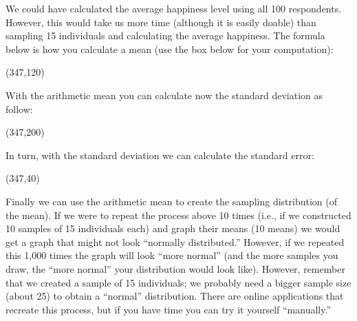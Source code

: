 We could have calculated the average happiness level using all 100 respondents. However, this would take us more time (although it is easily doable) than sampling 15 individuals and calculating the average happiness. The formula below is how you calculate a mean (use the box below for your computation):

\begin{center}
\end{center}

\framebox(347,120){} 

With the arithmetic mean you can calculate now the standard deviation as follow:

\begin{center}
\end{center}

\framebox(347,200){} 

In turn, with the standard deviation we can calculate the standard error:

\begin{center}
\end{center}

\framebox(347,40){} 

Finally we can use the arithmetic mean to create the sampling distribution (of the mean). If we were to repeat the process above 10 times (i.e., if we constructed 10 samples of 15 individuals each) and graph their means (10 means) we would get a graph that might not look ``normally distributed.'' However, if we repeated this 1,000 times the graph will look ``more normal'' (and the more samples you draw, the ``more normal'' your distribution would look like). However, remember that we created a sample of 15 individuals; we probably need a bigger sample size (about 25) to obtain a ``normal'' distribution. There are online applications that recreate this process, but if you have time you can try it yourself ``manually.''

